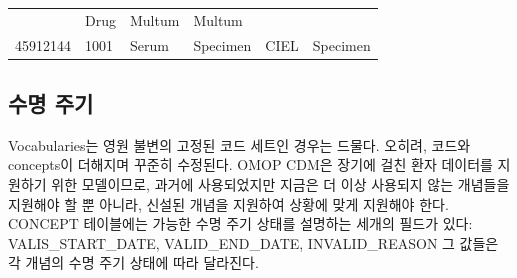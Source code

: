 \documentclass[11pt]{book}
\theoremstyle{definition}
\theoremstyle{definition}
\theoremstyle{definition}
\theoremstyle{remark}
\begin{document}
\begin{longtable}[]{@{}llllll@{}}
\begin{minipage}[t]{0.16\columnwidth}
\end{minipage} & \begin{minipage}[t]{0.14\columnwidth}\raggedright\strut
Drug\strut
\end{minipage} & \begin{minipage}[t]{0.14\columnwidth}\raggedright\strut
Multum\strut
\end{minipage} & \begin{minipage}[t]{0.14\columnwidth}\raggedright\strut
Multum\strut
\end{minipage}\tabularnewline
\begin{minipage}[t]{0.13\columnwidth}\raggedright\strut
45912144\strut
\end{minipage} & \begin{minipage}[t]{0.07\columnwidth}\raggedright\strut
1001\strut
\end{minipage} & \begin{minipage}[t]{0.16\columnwidth}\raggedright\strut
Serum\strut
\end{minipage} & \begin{minipage}[t]{0.14\columnwidth}\raggedright\strut
Specimen\strut
\end{minipage} & \begin{minipage}[t]{0.14\columnwidth}\raggedright\strut
CIEL\strut
\end{minipage} & \begin{minipage}[t]{0.14\columnwidth}\raggedright\strut
Specimen\strut
\end{minipage}\tabularnewline
\bottomrule
\end{longtable}

\subsection{수명 주기}\label{conceptLifeCycle}

Vocabularies는 영원 불변의 고정된 코드 세트인 경우는 드물다. 오히려,
코드와 concepts이 더해지며 꾸준히 수정된다. OMOP CDM은 장기에 걸친 환자
데이터를 지원하기 위한 모델이므로, 과거에 사용되었지만 지금은 더 이상
사용되지 않는 개념들을 지원해야 할 뿐 아니라, 신설된 개념을 지원하여
상황에 맞게 지원해야 한다. CONCEPT 테이블에는 가능한 수명 주기 상태를
설명하는 세개의 필드가 있다: VALIS\_START\_DATE, VALID\_END\_DATE,
INVALID\_REASON 그 값들은 각 개념의 수명 주기 상태에 따라 달라진다.
\end{document}
